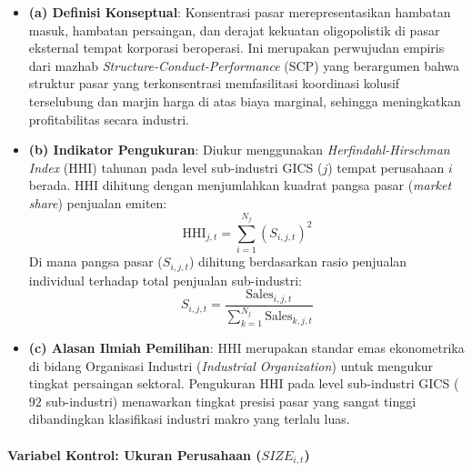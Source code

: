 \documentclass[12pt,a4paper]{article}
\providecommand{\tightlist}{%
  \setlength{\itemsep}{0pt}\setlength{\parskip}{0pt}%
}
\begin{document}
\begin{itemize}
\tightlist
\item
  \textbf{(a) Definisi Konseptual}: Konsentrasi pasar merepresentasikan
  hambatan masuk, hambatan persaingan, dan derajat kekuatan
  oligopolistik di pasar eksternal tempat korporasi beroperasi. Ini
  merupakan perwujudan empiris dari mazhab
  \emph{Structure-Conduct-Performance} (SCP) yang berargumen bahwa
  struktur pasar yang terkonsentrasi memfasilitasi koordinasi kolusif
  terselubung dan marjin harga di atas biaya marginal, sehingga
  meningkatkan profitabilitas secara industri.
\item
  \textbf{(b) Indikator Pengukuran}: Diukur menggunakan
  \emph{Herfindahl-Hirschman Index} (HHI) tahunan pada level
  sub-industri GICS (\(j\)) tempat perusahaan \(i\) berada. HHI dihitung
  dengan menjumlahkan kuadrat pangsa pasar (\emph{market share})
  penjualan emiten: \begin{equation}
  \mathrm{HHI}_{j,t} = \sum_{i=1}^{N_j} \left(S_{i,j,t}\right)^2
  \end{equation} Di mana pangsa pasar (\(S_{i,j,t}\)) dihitung
  berdasarkan rasio penjualan individual terhadap total penjualan
  sub-industri: \begin{equation}
  S_{i,j,t} = \frac{\text{Sales}_{i,j,t}}{\sum_{k=1}^{N_j} \text{Sales}_{k,j,t}}
  \end{equation}
\item
  \textbf{(c) Alasan Ilmiah Pemilihan}: HHI merupakan standar emas
  ekonometrika di bidang Organisasi Industri (\emph{Industrial
  Organization}) untuk mengukur tingkat persaingan sektoral. Pengukuran
  HHI pada level sub-industri GICS (\(92\) sub-industri) menawarkan
  tingkat presisi pasar yang sangat tinggi dibandingkan klasifikasi
  industri makro yang terlalu luas.
\end{itemize}

\paragraph{\texorpdfstring{Variabel Kontrol: Ukuran Perusahaan
(\(SIZE_{i,t}\))}{Variabel Kontrol: Ukuran Perusahaan (SIZE\_\{i,t\})}}\label{variabel-kontrol-ukuran-perusahaan-size_it}
\end{document}
